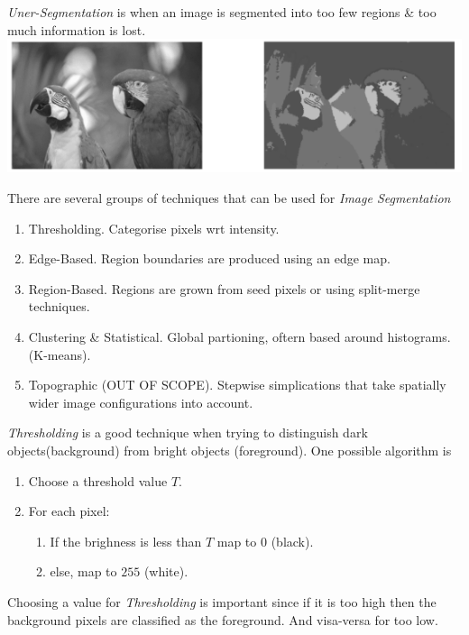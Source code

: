 \documentclass[11pt,a4paper]{article}
\begin{document}
\textit{Uner-Segmentation} is when an image is segmented into too few regions \& too much information is lost.\\

\includegraphics[scale=1]{img/underSegmentation.png}

There are several groups of techniques that can be used for \textit{Image Segmentation}
\begin{enumerate}[label=\roman*)]
	\item Thresholding. Categorise pixels wrt intensity.
	\item Edge-Based. Region boundaries are produced using an edge map.
	\item Region-Based. Regions are grown from seed pixels or using split-merge techniques.
	\item Clustering \& Statistical. Global partioning, oftern based around histograms. (\eg K-means).
	\item Topographic (OUT OF SCOPE). Stepwise simplications that take spatially wider image configurations into account.
\end{enumerate}

\textit{Thresholding} is a good technique when trying to distinguish dark objects(background) from bright objects (foreground). One possible algorithm is
\begin{enumerate}[label=\roman*)]
	\item Choose a threshold value $T$.
	\item For each pixel:
	\begin{enumerate}
		\item If the brighness is less than $T$ map to $0$ (black).
		\item else, map to $255$ (white).
	\end{enumerate}
\end{enumerate}

Choosing a value for \textit{Thresholding} is important since if it is too high then the background pixels are classified as the foreground. And visa-versa for too low.\\
\end{document}
